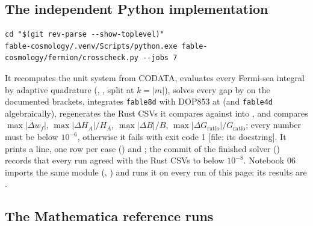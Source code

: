 \subsection{The independent Python implementation}
\label{sec:11.5}

\begin{Verbatim}
cd "$(git rev-parse --show-toplevel)"
fable-cosmology/.venv/Scripts/python.exe fable-cosmology/fermion/crosscheck.py --jobs 7
\end{Verbatim}
It recomputes the unit system from CODATA, evaluates every Fermi-sea integral by adaptive quadrature
(, , split at $k=|m|$), solves every gap by
 on the documented brackets, integrates \texttt{fable8d} with DOP853 at 
(and \texttt{fable4d} algebraically), regenerates the Rust CSVs it compares against into
, and compares $\max|\Delta w_f|$, $\max|\Delta H_A|/H_A$, $\max|\Delta B|/B$,
$\max|\Delta G_{\mathrm{ratio}}|/G_{\mathrm{ratio}}$; every number must be below $10^{-6}$, otherwise it fails
with exit code 1 [file: its docstring]. It prints a  line, one row per case
() and
; the commit of the finished solver ()
records that every run agreed with the Rust CSVs to below $10^{-8}$. Notebook 06 imports the same module
(,
) and runs it on every run of this
page; its results are .

\subsection{The Mathematica reference runs}
\label{sec:11.6}

